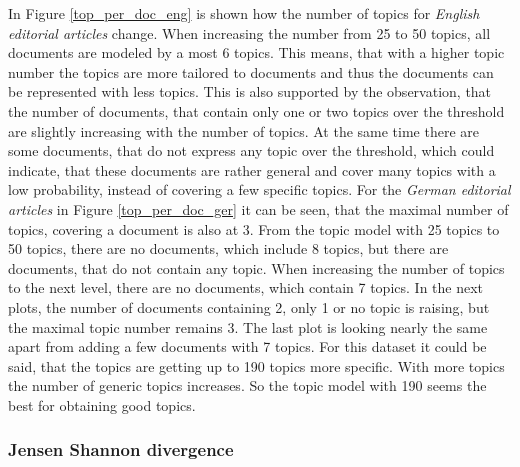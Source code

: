 In Figure \ref{top_per_doc_eng} is shown how the number of topics for \textit{English editorial articles} change. When increasing the number from 25 to 50 topics, all documents are modeled by a most 6 topics. This means, that with a higher topic number the topics are more tailored to documents and thus the documents can be represented with less topics. This is also supported by the observation, that the number of documents, that contain only one or two topics over the threshold are slightly increasing with the number of topics. At the same time there are some documents, that do not express any topic over the threshold, which could indicate, that these documents are rather general and cover many topics with a low probability, instead of covering a few specific topics.
For the \textit{German editorial articles} in Figure \ref{top_per_doc_ger} it can be seen, that the maximal number of topics, covering a document is also at 3. From the topic model with 25 topics to 50 topics, there are no documents, which include 8 topics, but there are documents, that do not contain any topic. When increasing the number of topics to the next level, there are no documents, which contain 7 topics. In the next plots, the number of documents containing 2, only 1 or no topic is raising, but the maximal topic number remains 3. The last plot is looking nearly the same apart from adding a few documents with 7 topics. For this dataset it could be said, that the topics are getting up to 190 topics more specific. With more topics the number of generic topics increases. So the topic model with 190 seems the best for obtaining good topics.


\subsubsection{Jensen Shannon divergence}

